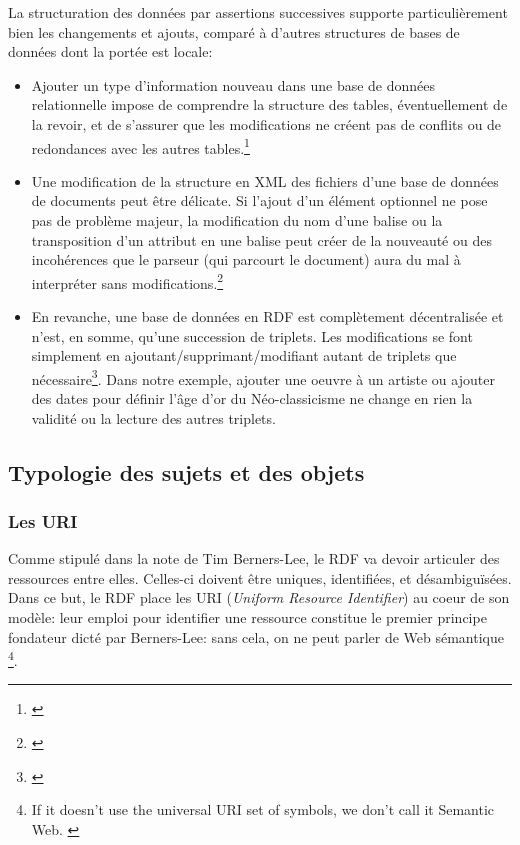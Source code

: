 \documentclass[a4paper,12pt,twoside]{book}
\begin{document}
La structuration des données par assertions successives supporte particulièrement bien les changements et ajouts, comparé à d'autres structures de bases de données dont la portée est locale:
\begin{itemize}
    \item Ajouter un type d'information nouveau dans une base de données relationnelle impose de comprendre la structure des tables, éventuellement de la revoir, et de s'assurer que les modifications ne créent pas de conflits ou de redondances avec les autres tables.\footnote{\cite[p.~53-54]{vanhoolandIntroductionAuxHumanites2016}} 
    \item Une modification de la structure en XML des fichiers d'une base de données de documents peut être délicate. Si l'ajout d'un élément optionnel ne pose pas de problème majeur, la modification du nom d'une balise ou la transposition d'un attribut en une balise peut créer de la nouveauté ou des incohérences que le parseur (qui parcourt le document) aura du mal à interpréter sans modifications.\footnote{\cite[p.~63-64]{vanhoolandIntroductionAuxHumanites2016}}
    \item En revanche, une base de données en RDF est complètement décentralisée et n'est, en somme, qu'une succession de triplets. Les modifications se font simplement en ajoutant/supprimant/modifiant autant de triplets que nécessaire\footnote{\cite[p.~72]{vanhoolandIntroductionAuxHumanites2016}}. Dans notre exemple, ajouter une oeuvre à un artiste ou ajouter des dates pour définir l'âge d'or du Néo-classicisme ne change en rien la validité ou la lecture des autres triplets. 
\end{itemize}


\subsection{Typologie des sujets et des objets}
\subsubsection{Les URI}

Comme stipulé dans la note de Tim Berners-Lee, le RDF va devoir articuler des ressources entre elles. Celles-ci doivent être uniques, identifiées, et désambiguïsées. Dans ce but, le RDF place les URI (\textit{Uniform Resource Identifier}) au coeur de son modèle: leur emploi pour identifier une ressource constitue le premier principe fondateur dicté par Berners-Lee: sans cela, \og on ne peut parler de Web sémantique \fg{} \footnote{\og If it doesn't use the universal URI set of symbols, we don't call it Semantic Web\fg. \cite{berners-leeLinkedData2006}}.\\
\end{document}
